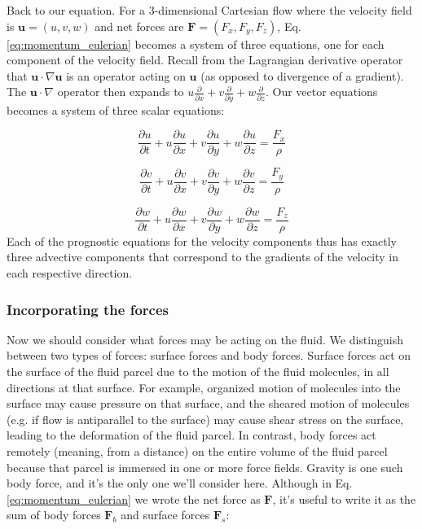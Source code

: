 \documentclass[12pt]{article}
\numberwithin{equation}{section}
\numberwithin{figure}{section}
\numberwithin{table}{section}
\begin{document}
Back to our equation.
For a 3-dimensional Cartesian flow where the velocity field is $\mathbf{u} = (u, v, w)$
and net forces are $\mathbf{F} = (F_x, F_y, F_z)$, Eq. \ref{eq:momentum_eulerian}
becomes a system of three equations, one for each component of the velocity field.
Recall from the Lagrangian derivative operator that $\mathbf{u} \cdot \nabla \mathbf{u}$
is an operator acting on $\mathbf{u}$ (as opposed to divergence of a gradient).
The $\mathbf{u} \cdot \nabla$ operator then expands to
$u\frac{\partial}{\partial x} + v\frac{\partial}{\partial y} + w\frac{\partial}{\partial z}$.
Our vector equations becomes a system of three scalar equations:

\begin{equation}
  \frac{\partial u}{\partial t} + u \frac{\partial u}{\partial x} + v \frac{\partial u}{\partial y} + w \frac{\partial u}{\partial z} = \frac{F_x}{\rho}
\end{equation}

\begin{equation}
  \frac{\partial v}{\partial t} + u \frac{\partial v}{\partial x} + v \frac{\partial v}{\partial y} + w \frac{\partial v}{\partial z} = \frac{F_y}{\rho}
\end{equation}

\begin{equation}
  \frac{\partial w}{\partial t} + u \frac{\partial w}{\partial x} + v \frac{\partial w}{\partial y} + w \frac{\partial w}{\partial z} = \frac{F_z}{\rho}
\end{equation}
Each of the prognostic equations for the velocity components thus has exactly
three advective components that correspond to the gradients of the velocity
in each respective direction.

\subsubsection{Incorporating the forces}

Now we should consider what forces may be acting on the fluid.
We distinguish between two types of forces: surface forces and body forces.
Surface forces act on the surface of the fluid parcel due to the motion of the
fluid molecules, in all directions at that surface.
For example, organized motion of molecules into the surface may cause pressure
on that surface, and the sheared motion of molecules (e.g. if flow is
antiparallel to the surface) may cause shear stress on the surface, leading to
the deformation of the fluid parcel.
In contrast, body forces act remotely (meaning, from a distance) on the entire
volume of the fluid parcel because that parcel is immersed in one or more force fields.
Gravity is one such body force, and it's the only one we'll consider here.
Although in Eq. \ref{eq:momentum_eulerian} we wrote the net force as $\mathbf{F}$,
it's useful to write it as the sum of body forces $\mathbf{F}_b$ and surface
forces $\mathbf{F}_s$:
\end{document}

